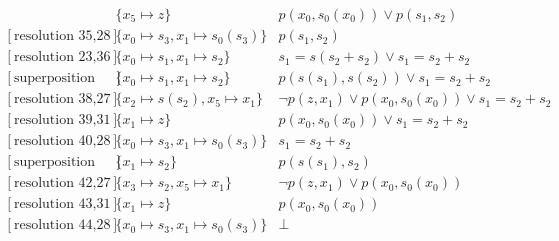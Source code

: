 \documentclass[onehalfspacing]{article}
\begin{document}
\begin{landscape}
\begin{align}
	[\text{resolution 26,31}] &\{x_5\mapsto z\}&	 p(x_0,s_0(x_0)) \vee p(s_1,s_2) \\
	[\text{resolution 35,28}] &\{x_0\mapsto s_3, x_1\mapsto s_0(s_3)\}&	 p(s_1,s_2) \\
	[\text{resolution 23,36}] &\{x_0\mapsto s_1, x_1\mapsto s_2\}& 	s_1 = s(s_2 + s_2) \vee s_1 = s_2 + s_2 \\
	[\text{superposition 24,37}] &\{x_0\mapsto s_1, x_1\mapsto s_2\}& 	 p(s(s_1),s(s_2)) \vee s_1 = s_2 + s_2 \\
	[\text{resolution 38,27}] &\{x_2\mapsto s(s_2), x_5\mapsto x_1\}& 	 \neg p(z,x_1) \vee p(x_0,s_0(x_0)) \vee s_1 = s_2 + s_2 \\
	[\text{resolution 39,31}] &\{x_1\mapsto z\}& 	 p(x_0,s_0(x_0)) \vee s_1 = s_2 + s_2 \\
	[\text{resolution 40,28}] &\{x_0\mapsto s_3, x_1\mapsto s_0(s_3)\}& 	 s_1 = s_2 + s_2 \\
	[\text{superposition 41,29}] &\{x_1\mapsto s_2\}&   p(s(s_1),s_2)\\
	[\text{resolution 42,27}] &\{x_3\mapsto s_2, x_5\mapsto x_1\}& 	 \neg p(z,x_1) \vee p(x_0,s_0(x_0)) \\
	[\text{resolution 43,31}] &\{x_1\mapsto z\}& 	 p(x_0,s_0(x_0)) \\
	[\text{resolution 44,28}] &\{x_0\mapsto s_3, x_1\mapsto s_0(s_3)\}& \bot
\end{align}
\end{landscape}
\end{document}
